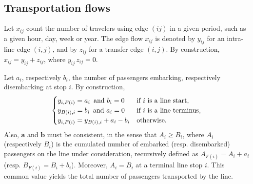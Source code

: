 \documentclass{bmcart}
\begin{document}
\vspace*{0.1cm}

\subsection{Transportation flows}
\label{Transportation flows}
Let  $x_{ij}$ count the number of travelers using edge $(ij)$ in a given period, such as a given hour, day, week or  year.  The edge flow $x_{ij}$ is denoted by $y_{ij}$ for an intra-line edge $(i,j)$, and 
by $z_{ij}$ for a transfer edge $(i,j)$. By construction, $x_{ij}=y_{ij}+z_{ij}$, where $y_{ij}\,  z_{ij}=0$. 

\vspace*{0.1cm}


Let $a_i$, respectively $b_i$, the number of passengers embarking, respectively disembarking at stop $i$. By construction, 
\begin{equation}
\label{bilan1ligne}
\begin{cases}
 y_{i,F(i)}=a_i \text{\,  and } b_i=0   & \text{if $i$ is a line start}, \\
y_{B(i),i}=b_i \text{\,  and } a_i=0   & \text{if $i$ is a line terminus}, \\
 y_{i,F(i)}=y_{B(i),i}+a_i-b_i     & \text{otherwise}.
\end{cases}
\end{equation}
Also, $\mathbf{a}$ and $\mathbf{b}$ must be consistent, in the sense that $A_i\ge B_i$, where $A_i$ (respectively $B_i$) is the cumulated number of embarked 
(resp. disembarked) passengers on the line under consideration, recursively defined as $A_{F(i)}=A_i+a_i$ (resp. $B_{F(i)}=B_i+b_i$). Moreover,  $A_i=B_i$ at a terminal line stop $i$. This common value yields  the total number of passengers transported by the line. 



\vspace*{0.1cm}
\end{document}
